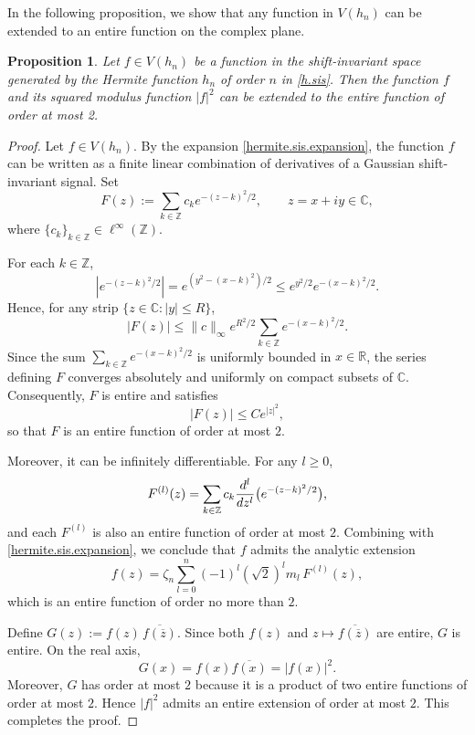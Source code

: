 \documentclass[11pt,oneside,reqno]{amsart}
\newtheorem{prop}[thm]{Proposition}
\numberwithin{equation}{section}
\begin{document}
 In the following proposition, we show that any function in $V(h_n)$ can be extended to an entire function on the complex plane.

\begin{prop}\label{hermite.lem}
{\rm Let $f\in V(h_n)$ be a function in the shift-invariant space generated by the Hermite function $h_n$ of order $n$ in \eqref{h.sis}.  Then the function $f$  and its squared modulus function $|f|^2$ can be extended to  the entire function of order at most 2.  }
\end{prop}

\begin{proof} 
Let $f\in V(h_n)$. By the expansion \eqref{hermite.sis.expansion}, the function $f$ can be written
as a finite linear combination of derivatives of a Gaussian shift-invariant signal. 
Set
\[
F(z):=\sum_{k\in\mathbb Z} c_k e^{-(z-k)^2/2}, \qquad z=x+iy\in\mathbb C,
\]
where $\{c_k\}_{k\in\mathbb Z}\in\ell^\infty(\mathbb Z)$.

For each $k\in\mathbb Z$,
\[
|e^{-(z-k)^2/2}|
= e^{(y^2-(x-k)^2)/2}
\le e^{y^2/2} e^{-(x-k)^2/2}.
\]
Hence, for any strip $\{z\in\mathbb C:|y|\le R\}$,
\[
|F(z)|
\le \|c\|_\infty e^{R^2/2}
\sum_{k\in\mathbb Z} e^{-(x-k)^2/2}.
\]
Since the sum $\sum_{k\in\mathbb Z} e^{-(x-k)^2/2}$ is uniformly bounded in
$x\in\mathbb R$, the series defining $F$ converges absolutely and uniformly on compact subsets of $\mathbb C$. Consequently, $F$ is entire and satisfies
\[
|F(z)|\le C e^{|z|^2},
\]
so that $F$ is an entire function of order at most $2$.

Moreover, it can be infinitely differentiable. For any $l\ge 0$,
\[
F^{(l)}(z)=\sum_{k\in\mathbb Z} c_k
\frac{{\rm d}^l}{{\rm d}z^l}\big(e^{-(z-k)^2/2}\big),
\]
and  each $F^{(l)}$ is also an entire function of order at most $2$.
Combining with \eqref{hermite.sis.expansion}, we conclude that $f$ admits the analytic extension
\begin{equation}\label{f.rep}
f(z)=\zeta_n\sum_{l=0}^n (-1)^l(\sqrt2)^l m_l\,F^{(l)}(z),
\end{equation}
which is an entire function of order no more than $2$. 

\smallskip 

Define $G(z):=f(z)\,\overline{f(\overline{z})}$. Since both
$f(z)$ and $z\mapsto\overline{f(\overline{z})}$ are entire, $G$ is entire. On the real axis,
\[
G(x)=f(x)\overline{f(x)}=|f(x)|^2.
\]
Moreover, $G$ has order at most $2$ because it is a product of two entire
functions of order at most $2$. Hence $|f|^2$ admits an entire extension of order at most $2$.  This completes the proof.

\end{proof}
\end{document}
